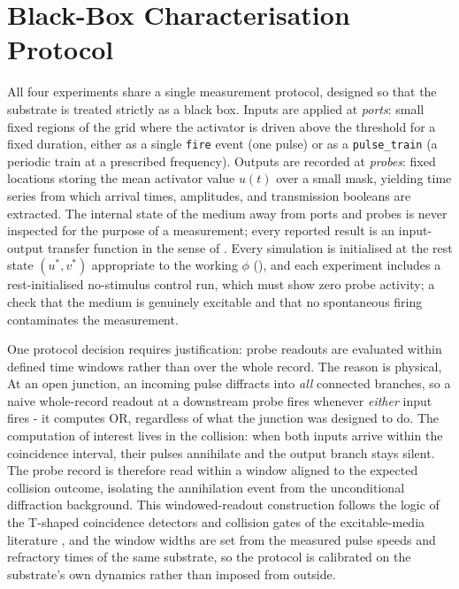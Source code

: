 \section{Black-Box Characterisation Protocol}
\label{sec:meth_protocol}

All four experiments share a single measurement protocol, designed so that the substrate is treated strictly as a black box. 
Inputs are applied at \emph{ports}: small fixed regions of the grid where the activator is driven above the threshold for a fixed duration, either as a single \texttt{fire} event (one pulse) or as a \texttt{pulse\_train} (a periodic train at a prescribed frequency). 
Outputs are recorded at \emph{probes}: fixed locations storing the mean activator value $u(t)$ over a small mask, yielding time series from which arrival times, amplitudes, and transmission booleans are extracted. 
The internal state of the medium away from ports and probes is never inspected for the purpose of a measurement; every reported result is an input-output transfer function in the sense of . 
Every simulation is initialised at the rest state $(u^{*}, v^{*})$ appropriate to the working $\phi$ (), and each experiment includes a rest-initialised no-stimulus control run, which must show zero probe activity; a check that the medium is genuinely excitable and that no spontaneous firing contaminates the measurement.

One protocol decision requires justification: probe readouts are evaluated within defined time windows rather than over the whole record. 
The reason is physical, At an open junction, an incoming pulse diffracts into \emph{all} connected branches, so a naive whole-record readout at a downstream probe fires whenever \emph{either} input fires - it computes OR, regardless of what the junction was designed to do. 
The computation of interest lives in the collision: when both inputs arrive within the coincidence interval, their pulses annihilate and the output branch stays silent. 
The probe record is therefore read within a window aligned to the expected collision outcome, isolating the annihilation event from the unconditional diffraction background. 
This windowed-readout construction follows the logic of the T-shaped coincidence detectors and collision gates of the excitable-media literature \cite{gorecka2003tshaped, toth1995logic}, and the window widths are set from the measured pulse speeds and refractory times of the same substrate, so the protocol is calibrated on the substrate's own dynamics rather than imposed from outside.

